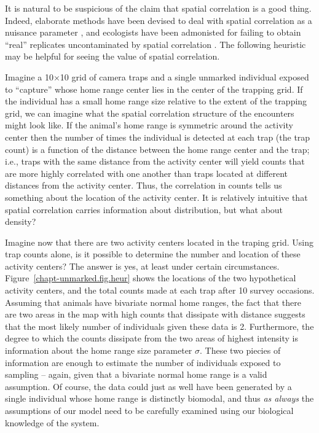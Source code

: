 It is natural to be suspicious of the claim that spatial correlation
is a good thing. Indeed, elaborate methods have been devised to deal
with spatial correlation as a nuisance parameter
\citep{lichstein_etal:2002,dormann_etal:2007}, and ecologists have been admonisted for
failing to obtain ``real'' replicates uncontaminated by spatial
correlation \citep{hurlbert:1984}. The following heuristic may be
helpful for seeing the value of spatial correlation.

Imagine a 10$\times$10 grid of camera traps and a single unmarked
individual exposed to ``capture'' whose home range center lies in the center of the
trapping grid. If the individual has a small home range size relative
to the extent of the trapping grid, we can imagine what the
spatial correlation structure of the encounters might look
like. If the animal's home range is symmetric around the activity center
then the number of times the individual is detected at each
trap (the trap count) is a function of the distance between the home
range center and the trap; i.e., traps with the same distance
from the activity center will yield counts that are more highly
correlated with one another than traps located at different distances
from the activity center. Thus, the correlation in counts tells us
something about the location of the activity center. It is relatively
intuitive that spatial correlation carries information about
distribution, but what about density?


Imagine now that there are two activity centers located in the traping
grid. Using trap counts alone, %
is it possible to determine the number and location of these activity
centers? The answer is yes, at least under certain circumstances.
Figure~\ref{chapt-unmarked.fig.heur} %
shows the locations of the two hypothetical activity centers, and the total
counts made at each trap after 10 survey occasions.
Assuming that animals have bivariate normal home
ranges, the fact that there are two areas in the map with high counts
that dissipate with distance suggests that the most likely number of
individuals given these data is 2. Furthermore, the degree to which
the counts dissipate from the two areas of highest intensity is
information about the home range size parameter $\sigma$. These two
piecies of information are enough to estimate the number of
individuals exposed to sampling -- again, given
that a bivariate normal home range is a valid assumption. Of course,
the data could just as well have been generated by a single individual
whose home range is distinctly biomodal, and thus \textit{as always}
the assumptions of our model need to be carefully examined using our
biological knowledge of the system.

